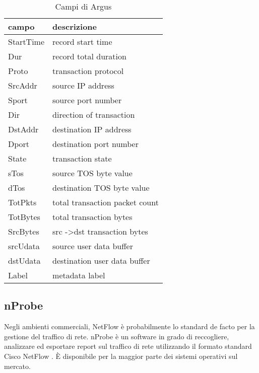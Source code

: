\documentclass[../main.tex]{subfiles}
\begin{document}
\begin{table}[h]
				\centering
\begin{tabular}{|l|l|}
\hline
\textbf{campo} & \textbf{descrizione}                    \\ \hline
StartTime      & record start time                       \\ \hline
Dur            & record total duration                   \\ \hline
Proto          & transaction protocol                    \\ \hline
SrcAddr        & source IP address                       \\ \hline
Sport          & source port number                      \\ \hline
Dir            & direction of transaction                \\ \hline
DstAddr        & destination IP address                  \\ \hline
Dport          & destination port number                 \\ \hline
State          & transaction state                       \\ \hline
sTos           & source TOS byte value                   \\ \hline
dTos           & destination TOS byte value              \\ \hline
TotPkts        & total transaction packet count          \\ \hline
TotBytes       & total transaction bytes                 \\ \hline
SrcBytes       & src -\textgreater dst transaction bytes \\ \hline
srcUdata       & source user data buffer                 \\ \hline
dstUdata       & destination user data buffer            \\ \hline
Label          & metadata label                          \\ \hline
\end{tabular}\par
				\caption{Campi di Argus}
\label{table:campiArgus}
\end{table}

\subsection{nProbe}

Negli ambienti commerciali, NetFlow è probabilmente lo standard de facto per la gestione del traffico di rete. nProbe è un software in grado di reccogliere, analizzare ed esportare report sul traffico di rete utilizzando il formato standard Cisco NetFlow \cite{nProbe}. È disponibile per la maggior parte dei sistemi operativi sul mercato. 
\end{document}
